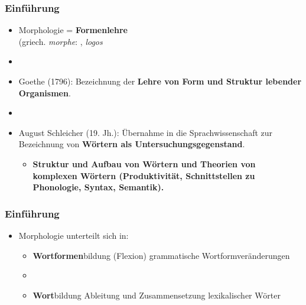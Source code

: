 \begin{frame}
\frametitle{Einführung}

\begin{itemize}
	\item Morphologie = \textbf{Formenlehre} \\
	(griech. \emph{morphe}: , \emph{logos} 
	\item[]
	\item Goethe (1796): Bezeichnung der \textbf{Lehre von Form und Struktur lebender Organismen}.
	\item[]
	\item August Schleicher (19. Jh.): Übernahme in die Sprachwissenschaft zur Bezeichnung von \textbf{Wörtern als Untersuchungsgegenstand}.
	
	\begin{itemize}
		\item \ras \bf{Struktur und Aufbau von Wörtern} und \bf{Theorien von komplexen Wörtern} (Produktivität, Schnittstellen zu Phonologie, Syntax, Semantik).
	\end{itemize}
\end{itemize}


\end{frame}


\begin{frame}
\frametitle{Einführung}

\begin{itemize}
	\item Morphologie unterteilt sich in:
	
	\begin{itemize}
		\item \textbf{Wortformen}bildung (Flexion) \ras grammatische Wortformveränderungen
		\item[]
		\item \textbf{Wort}bildung \ras Ableitung und Zusammensetzung lexikalischer Wörter
	\end{itemize}
\end{itemize}

\begin{figure}	
\centering
\scalebox{0.55}{
\begin{forest} %
sm edges,
	[Morphologie
		[Flexion
			[Konjugation] 
			[Deklination]]
		[Wortbildung
			[Komposition
				[Determinativ]
				[Kopulativ]
				[\dots]]
			[Derivation
				[Suffigierung]
				[Präfigierung]
				[\dots]]
			[Konversion
				[morphologisch]
				[syntaktisch]]
			[Rückbildung]
			[\dots]]]										
\end{forest}}
\end{figure}


\end{frame}


